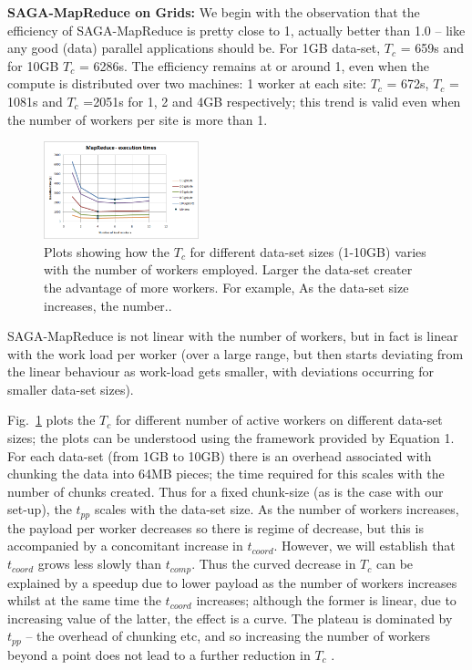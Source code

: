 \documentclass[conference,final]{IEEEtran}
\newcommand{\sagamapreduce }{SAGA-MapReduce }
\newcommand{\tc }{ $T_c$ }
\begin{document}
{\bf SAGA-MapReduce on Grids:} We begin with the observation that the
efficiency of \sagamapreduce is pretty close to 1, actually better
than 1.0 -- like any good (data) parallel applications should be.  For
1GB data-set, \tc = 659s and for 10GB \tc = 6286s.  The efficiency
remains at or around 1, even when the compute is distributed over two
machines: 1 worker at each site: \tc = 672s, \tc = 1081s and \tc
=2051s for 1, 2 and 4GB respectively; this trend is valid even when
the number of workers per site is more than 1.
\begin{figure}[t]
  \includegraphics[width=0.4\textwidth]{MapReduce_local_executiontime.png}
\caption{Plots showing how the \tc for different data-set sizes
  (1-10GB) varies with the number of workers employed.
  Larger the data-set creater the advantage of more workers. For
  example, As the data-set size increases, the number..}
\label{grids1}
\end{figure}
\sagamapreduce is not linear with the number of workers, but in fact
is linear with the work load per worker (over a large range, but then starts deviating from the linear behaviour as work-load gets smaller, with deviations
occurring for smaller data-set sizes). %

Fig.~\ref{grids1} plots the \tc for different number of active workers
on different data-set sizes; the plots can be understood using the
framework provided by Equation 1. For each data-set (from 1GB to 10GB)
there is an overhead associated with chunking the data into 64MB
pieces; the time required for this scales with the number of chunks
created.  Thus for a fixed chunk-size (as is the case with our
set-up), the $t_{pp}$ scales with the data-set size. As the number of
workers increases, the payload per worker decreases so there is regime
of decrease, but this is accompanied by a concomitant increase in
$t_{coord}$. However, we will establish that $t_{coord}$ grows less
slowly than $t_{comp}$. Thus the curved decrease in \tc can be
explained by a speedup due to lower payload as the number of workers
increases whilst at the same time the $t_{coord}$ increases; although
the former is linear, due to increasing value of the latter, the
effect is a curve. The plateau is dominated by $t_{pp}$ -- the
overhead of chunking etc, and so increasing the number of workers
beyond a point does not lead to a further reduction in \tc.
\end{document}
